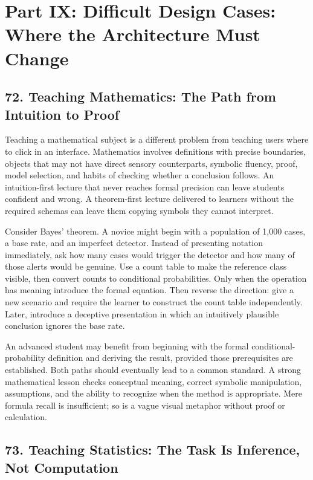 \section*{Part IX: Difficult Design Cases: Where the Architecture Must Change}

\subsection*{72. Teaching Mathematics: The Path from Intuition to Proof}

Teaching a mathematical subject is a different problem from teaching users where to click in an interface. Mathematics involves definitions with precise boundaries, objects that may not have direct sensory counterparts, symbolic fluency, proof, model selection, and habits of checking whether a conclusion follows. An intuition-first lecture that never reaches formal precision can leave students confident and wrong. A theorem-first lecture delivered to learners without the required schemas can leave them copying symbols they cannot interpret.

Consider Bayes' theorem. A novice might begin with a population of 1,000 cases, a base rate, and an imperfect detector. Instead of presenting notation immediately, ask how many cases would trigger the detector and how many of those alerts would be genuine. Use a count table to make the reference class visible, then convert counts to conditional probabilities. Only when the operation has meaning introduce the formal equation. Then reverse the direction: give a new scenario and require the learner to construct the count table independently. Later, introduce a deceptive presentation in which an intuitively plausible conclusion ignores the base rate.

An advanced student may benefit from beginning with the formal conditional-probability definition and deriving the result, provided those prerequisites are established. Both paths should eventually lead to a common standard. A strong mathematical lesson checks conceptual meaning, correct symbolic manipulation, assumptions, and the ability to recognize when the method is appropriate. Mere formula recall is insufficient; so is a vague visual metaphor without proof or calculation.

\subsection*{73. Teaching Statistics: The Task Is Inference, Not Computation}

